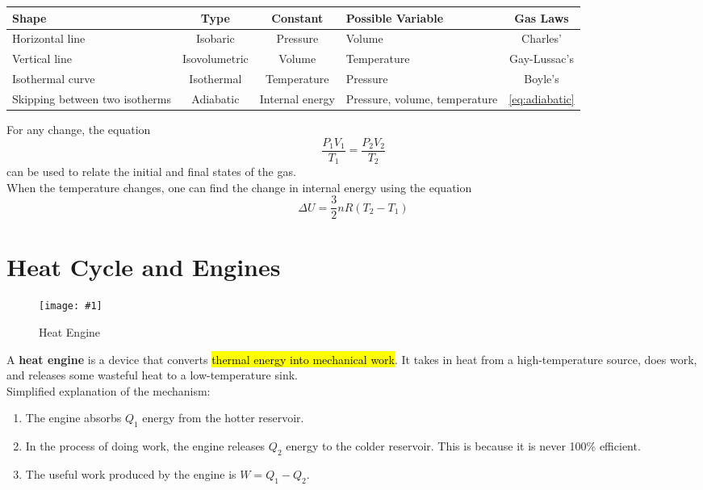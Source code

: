 \documentclass[a4paper,12pt]{article}
\let\oldsection\section
\renewcommand\section{\clearpage\oldsection}
\newcommand{\lb}{\\[8pt]}
\newcommand{\img}[4]{\begin{center}
  \begin{figure}[H]
    \centering
    \texttt{[image: \#1]}
    \caption{#3}
    \label{fig:#4}
  \end{figure}
\end{center}}
\begin{document}
\begin{table}[H]
  \centering
  \begin{tabular}{|P{0.2\textwidth}|c|c|P{0.23\textwidth}|c|}
    \hline
     \textbf{Shape} & \textbf{Type} & \textbf{Constant} & \textbf{Possible Variable}    & \textbf{Gas Laws}   \\ \hline
    Horizontal line                            & Isobaric      & Pressure          & Volume                        & Charles'            \\ \hline
    Vertical line                              & Isovolumetric & Volume            & Temperature                   & Gay-Lussac's        \\ \hline
    Isothermal curve                           & Isothermal    & Temperature       & Pressure                      & Boyle's             \\ \hline
    Skipping between two isotherms             & Adiabatic     & Internal energy   & Pressure, volume, temperature & \cref{eq:adiabatic} \\ \hline
  \end{tabular}
\end{table}

For any change, the equation $$\frac{P_1V_1}{T_1} = \frac{P_2V_2}{T_2}$$ can be used to relate the initial and final states of the gas.\lb
When the temperature changes, one can find the change in internal energy using the equation $$\Delta U = \frac{3}{2}nR(T_2 - T_1)$$

\section{Heat Cycle and Engines}


\begin{minipage}{0.35\textwidth}
  \img{engine.png}{1}{Heat Engine}{heatengine}
\end{minipage}\hspace*{0.02\textwidth}%
\begin{minipage}{0.6\textwidth}
  A \textbf{heat engine} is a device that converts \hl{thermal energy into mechanical work}. It takes in heat from a high-temperature source, does work, and releases some wasteful heat to a low-temperature sink.\lb
  Simplified explanation of the mechanism:
  \begin{enumerate}
    \item The engine absorbs $Q_1$ energy from the hotter reservoir.
    \item In the process of doing work, the engine releases $Q_2$ energy to the colder reservoir. This is because it is never 100\% efficient.
    \item The useful work produced by the engine is $W = Q_1 - Q_2$.
  \end{enumerate}
\end{minipage}\lb
\end{document}
